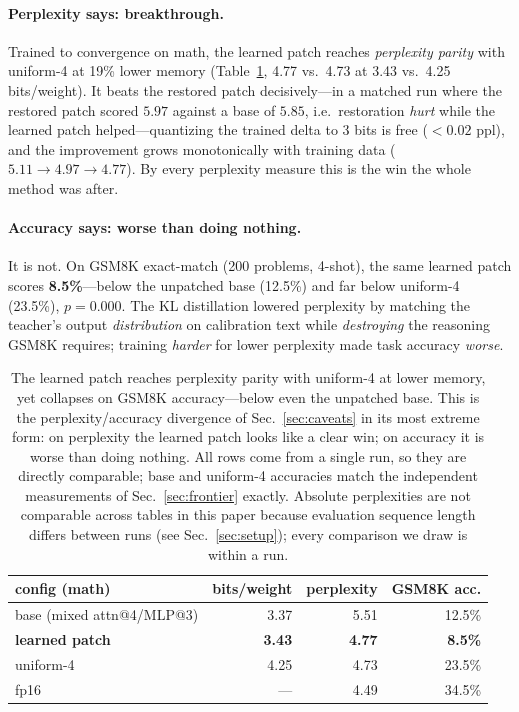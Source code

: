 \documentclass[manuscript, screen, review]{jair}
\newcommand{\bpw}{bits/weight}
\begin{document}
\paragraph{Perplexity says: breakthrough.} Trained to convergence on math, the
learned patch reaches \emph{perplexity parity} with uniform-4 at 19\% lower
memory (Table~\ref{tab:learned}, 4.77 vs.\ 4.73 at 3.43 vs.\ 4.25 \bpw{}). It
beats the restored patch decisively---in a matched run where the restored patch
scored $5.97$ against a base of $5.85$, i.e.\ restoration \emph{hurt} while the
learned patch helped---quantizing the trained delta to 3 bits is free
($<0.02$ ppl), and the improvement grows monotonically with training data
($5.11 \to 4.97 \to 4.77$). By every perplexity measure this is the win the
whole method was after.

\paragraph{Accuracy says: worse than doing nothing.} It is not. On GSM8K
exact-match (200 problems, 4-shot), the same learned patch scores
\textbf{8.5\%}---below the unpatched base (12.5\%) and far below uniform-4
(23.5\%), $p{=}0.000$. The KL distillation lowered perplexity by matching the
teacher's output \emph{distribution} on calibration text while \emph{destroying}
the reasoning GSM8K requires; training \emph{harder} for lower perplexity made
task accuracy \emph{worse}.

\begin{table}[t]
\centering
\caption{The learned patch reaches perplexity parity with uniform-4 at lower
memory, yet collapses on GSM8K accuracy---below even the unpatched base. This
is the perplexity/accuracy divergence of Sec.~\ref{sec:caveats} in its most
extreme form: on perplexity the learned patch looks like a clear win; on
accuracy it is worse than doing nothing. All rows come from a single run, so
they are directly comparable; base and uniform-4 accuracies match the
independent measurements of Sec.~\ref{sec:frontier} exactly. Absolute
perplexities are not comparable across tables in this paper because evaluation
sequence length differs between runs (see Sec.~\ref{sec:setup}); every
comparison we draw is within a run.}
\label{tab:learned}
\begin{tabular}{lrrr}
\toprule
config (math) & \bpw{} & perplexity & GSM8K acc. \\
\midrule
base (mixed attn@4/MLP@3) & 3.37 & 5.51 & 12.5\% \\
\textbf{learned patch} & \textbf{3.43} & \textbf{4.77} & \textbf{8.5\%} \\
uniform-4 & 4.25 & 4.73 & 23.5\% \\
fp16 & --- & 4.49 & 34.5\% \\
\bottomrule
\end{tabular}
\end{table}
\end{document}
